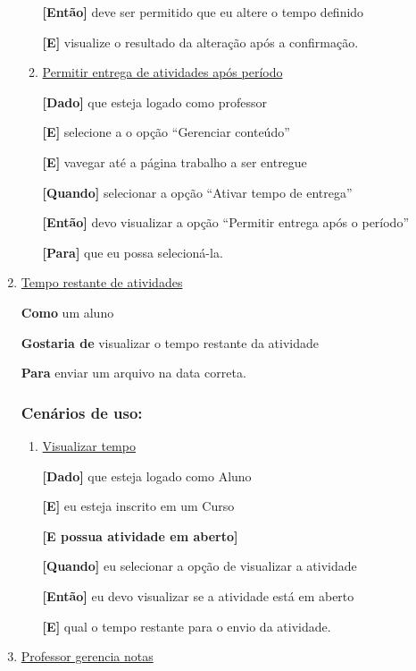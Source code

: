 \begin{enumerate}
\begin{enumerate}
\textbf{[Então]} deve ser permitido que eu altere o tempo definido

\textbf{[E]} visualize o resultado da alteração após a confirmação.

\item \underline{Permitir entrega de atividades após período}

\textbf{[Dado]} que esteja logado como professor

\textbf{[E]} selecione a o opção ``Gerenciar conteúdo''

\textbf{[E]} vavegar até a página trabalho a ser entregue

\textbf{[Quando]} selecionar a opção ``Ativar tempo de entrega''

\textbf{[Então]} devo visualizar a opção ``Permitir entrega após o período''

\textbf{[Para]} que eu possa selecioná-la.

\end{enumerate}
\item \underline{Tempo restante de atividades}

\textbf{Como} um aluno

\textbf{Gostaria de} visualizar o tempo restante da atividade

\textbf{Para} enviar um arquivo na data correta.

\subsubsection*{Cenários de uso:}

\begin{enumerate}
\item \underline{Visualizar tempo}

\textbf{[Dado]} que esteja logado como Aluno

\textbf{[E]} eu esteja inscrito em um Curso

\textbf{[E possua atividade em aberto]}

\textbf{[Quando]} eu selecionar a opção de visualizar a atividade

\textbf{[Então]} eu devo visualizar se a atividade está em aberto

\textbf{[E]} qual o tempo restante para o envio da atividade.

\end{enumerate}

\item \underline{Professor gerencia notas}


\end{enumerate}

